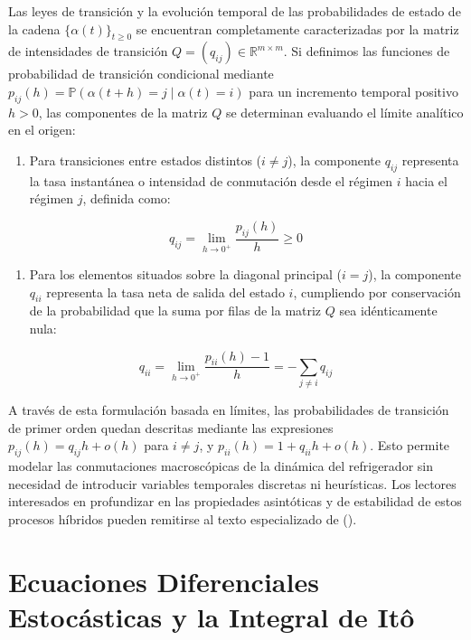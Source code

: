 \documentclass[
  spanish,
  letterpaper,
  DIV=11,
  numbers=noendperiod]{scrreprt}
\providecommand{\tightlist}{%
  \setlength{\itemsep}{0pt}\setlength{\parskip}{0pt}}
\theoremstyle{plain}
\theoremstyle{definition}
\theoremstyle{remark}
\begin{document}
Las leyes de transición y la evolución temporal de las probabilidades de
estado de la cadena \(\{\alpha(t)\}_{t \ge 0}\) se encuentran
completamente caracterizadas por la matriz de intensidades de transición
\(Q = (q_{ij}) \in \mathbb{R}^{m \times m}\). Si definimos las funciones
de probabilidad de transición condicional mediante
\(p_{ij}(h) = \mathbb{P}(\alpha(t+h) = j \mid \alpha(t) = i)\) para un
incremento temporal positivo \(h > 0\), las componentes de la matriz
\(Q\) se determinan evaluando el límite analítico en el origen:

\begin{enumerate}
\def\labelenumi{\arabic{enumi}.}
\tightlist
\item
  Para transiciones entre estados distintos (\(i \neq j\)), la
  componente \(q_{ij}\) representa la tasa instantánea o intensidad de
  conmutación desde el régimen \(i\) hacia el régimen \(j\), definida
  como:
\end{enumerate}

\[
q_{ij} = \lim_{h \to 0^+} \frac{p_{ij}(h)}{h} \ge 0
\]

\begin{enumerate}
\def\labelenumi{\arabic{enumi}.}
\setcounter{enumi}{1}
\tightlist
\item
  Para los elementos situados sobre la diagonal principal (\(i = j\)),
  la componente \(q_{ii}\) representa la tasa neta de salida del estado
  \(i\), cumpliendo por conservación de la probabilidad que la suma por
  filas de la matriz \(Q\) sea idénticamente nula:
\end{enumerate}

\[
q_{ii} = \lim_{h \to 0^+} \frac{p_{ii}(h) - 1}{h} = -\sum_{j \neq i} q_{ij}
\]

A través de esta formulación basada en límites, las probabilidades de
transición de primer orden quedan descritas mediante las expresiones
\(p_{ij}(h) = q_{ij}h + o(h)\) para \(i \neq j\), y
\(p_{ii}(h) = 1 + q_{ii}h + o(h)\). Esto permite modelar las
conmutaciones macroscópicas de la dinámica del refrigerador sin
necesidad de introducir variables temporales discretas ni heurísticas.
Los lectores interesados en profundizar en las propiedades asintóticas y
de estabilidad de estos procesos híbridos pueden remitirse al texto
especializado de ().

\section{Ecuaciones Diferenciales Estocásticas y la Integral de
Itô}\label{ecuaciones-diferenciales-estocuxe1sticas-y-la-integral-de-ituxf4}
\end{document}
